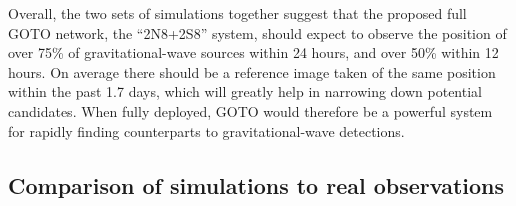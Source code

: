 \begin{colsection}
Overall, the two sets of simulations together suggest that the proposed full GOTO network, the ``2N8+2S8'' system, should expect to observe the position of over 75\% of gravitational-wave sources within 24 hours, and over 50\% within 12 hours. On average there should be a reference image taken of the same position within the past 1.7 days, which will greatly help in narrowing down potential candidates. When fully deployed, GOTO would therefore be a powerful system for rapidly finding counterparts to gravitational-wave detections.

\newpage

\end{colsection}


\subsection{Comparison of simulations to real observations}
\label{sec:survey_sim_150}
